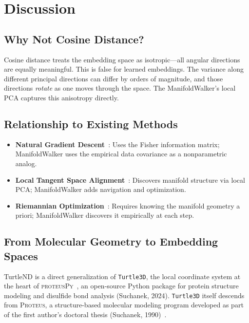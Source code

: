 \documentclass[11pt,letterpaper]{article}
\begin{document}
\section{Discussion}
\label{sec:discussion}

\subsection{Why Not Cosine Distance?}

Cosine distance treats the embedding space as isotropic---all angular
directions are equally meaningful. This is false for learned embeddings.
The variance along different principal directions can differ by orders of
magnitude, and those directions \emph{rotate} as one moves through the space.
The ManifoldWalker's local PCA captures this anisotropy directly.

\subsection{Relationship to Existing Methods}

\begin{itemize}[nosep]
  \item \textbf{Natural Gradient Descent}~\cite{amari1998}: Uses the Fisher
    information matrix; ManifoldWalker uses the empirical data covariance
    as a nonparametric analog.
  \item \textbf{Local Tangent Space Alignment}~\cite{zhang2004}:
    Discovers manifold structure via local PCA; ManifoldWalker adds
    navigation and optimization.
  \item \textbf{Riemannian Optimization}~\cite{absil2008}: Requires
    knowing the manifold geometry a priori; ManifoldWalker discovers it
    empirically at each step.
\end{itemize}

\subsection{From Molecular Geometry to Embedding Spaces}

TurtleND is a direct generalization of \texttt{Turtle3D}, the local
coordinate system at the heart of \textsc{proteusPy}~\cite{suchanek2024proteuspyjoss},
an open-source Python package for protein structure modeling and disulfide
bond analysis (Suchanek, 2024).  \texttt{Turtle3D} itself descends from
\textsc{Proteus}, a structure-based molecular modeling program developed
as part of the first author's doctoral thesis (Suchanek, 1990)~\cite{suchanek1990}.
\end{document}
